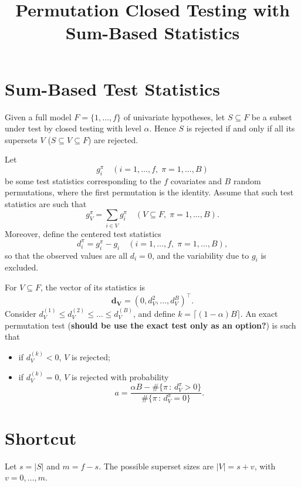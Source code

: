 \documentclass[11pt,a4paper,openright,twoside]{article}
\title{Permutation Closed Testing with Sum-Based Statistics}
\author{}
\date{}
\begin{document}
\maketitle


\section{Sum-Based Test Statistics}
Given a full model $F=\{1,\ldots, f\}$ of univariate hypotheses, let $S\subseteq F$ be a subset under test by closed testing with level $\alpha$. Hence $S$ is rejected if and only if all its supersets $V$ ($S\subseteq V\subseteq F$) are rejected.

Let
\[g_i^\pi\quad (i=1,\ldots,f,\; \pi=1,\ldots,B)\]
be some test statistics corresponding to the $f$ covariates and $B$ random permutations, where the first permutation is the identity. Assume that such test statistics are such that
\[g_V^\pi=\sum_{i\in V}g_i^\pi\quad (V\subseteq F,\;\pi=1,\ldots,B).\]
Moreover, define the centered test statistics
\[d_i^\pi = g_i^\pi - g_i \quad (i=1,\ldots,f,\; \pi=1,\ldots,B),\]
so that the observed values are all $d_i=0$, and the variability due to $g_i$ is excluded.

For $V\subseteq F$, the vector of its statistics is
\[\mathbf{d_V}=(0,d_V^2,\ldots,d_V^B)^\top.\]
Consider $d_V^{(1)}\leq d_V^{(2)}\leq\ldots\leq d_V^{(B)}$, and define $k=\lceil (1-\alpha) B\rceil$. An exact permutation test (\textbf{should be use the exact test only as an option?}) is such that
\begin{itemize}
\item if $d_V^{(k)}<0$, $V$ is rejected;
\item if $d_V^{(k)}=0$, $V$ is rejected with probability
\[a=\frac{\alpha B - \#\{\pi\,:\,d_V^\pi>0\}}{\#\{\pi\,:\,d_V^\pi=0\}}.\]
\end{itemize}







\vspace{10mm}

\section{Shortcut}
Let $s=|S|$ and $m=f-s$. The possible superset sizes are $|V|=s+v$, with $v=0,\ldots,m$.
\end{document}
